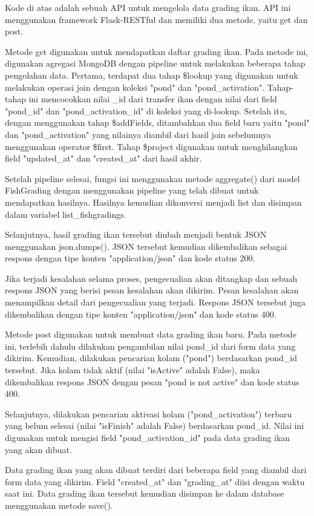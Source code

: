 \begin{enumerate}[1.]
Kode di atas adalah sebuah API untuk mengelola data grading ikan. API ini menggunakan framework Flask-RESTful dan memiliki dua metode, yaitu get dan post.

Metode get digunakan untuk mendapatkan daftar grading ikan. Pada metode ini, digunakan agregasi MongoDB dengan pipeline untuk melakukan beberapa tahap pengolahan data. Pertama, terdapat dua tahap \$lookup yang digunakan untuk melakukan operasi join dengan koleksi "pond" dan "pond\_activation". Tahap-tahap ini mencocokkan nilai \_id dari transfer ikan dengan nilai dari field "pond\_id" dan "pond\_activation\_id" di koleksi yang di-lookup. Setelah itu, dengan menggunakan tahap \$addFields, ditambahkan dua field baru yaitu "pond" dan "pond\_activation" yang nilainya diambil dari hasil join sebelumnya menggunakan operator \$first. Tahap \$project digunakan untuk menghilangkan field "updated\_at" dan "created\_at" dari hasil akhir.

Setelah pipeline selesai, fungsi ini menggunakan metode aggregate() dari model FishGrading dengan menggunakan pipeline yang telah dibuat untuk mendapatkan hasilnya. Hasilnya kemudian dikonversi menjadi list dan disimpan dalam variabel list\_fishgradings.

Selanjutnya, hasil grading ikan tersebut diubah menjadi bentuk JSON menggunakan json.dumps(). JSON tersebut kemudian dikembalikan sebagai respons dengan tipe konten "application/json" dan kode status 200.

Jika terjadi kesalahan selama proses, pengecualian akan ditangkap dan sebuah respons JSON yang berisi pesan kesalahan akan dikirim. Pesan kesalahan akan menampilkan detail dari pengecualian yang terjadi. Respons JSON tersebut juga dikembalikan dengan tipe konten "application/json" dan kode status 400.

Metode post digunakan untuk membuat data grading ikan baru. Pada metode ini, terlebih dahulu dilakukan pengambilan nilai pond\_id dari form data yang dikirim. Kemudian, dilakukan pencarian kolam ("pond") berdasarkan pond\_id tersebut. Jika kolam tidak aktif (nilai "isActive" adalah False), maka dikembalikan respons JSON dengan pesan "pond is not active" dan kode status 400.

Selanjutnya, dilakukan pencarian aktivasi kolam ("pond\_activation") terbaru yang belum selesai (nilai "isFinish" adalah False) berdasarkan pond\_id. Nilai ini digunakan untuk mengisi field "pond\_activation\_id" pada data grading ikan yang akan dibuat.

Data grading ikan yang akan dibuat terdiri dari beberapa field yang diambil dari form data yang dikirim. Field "created\_at" dan "grading\_at" diisi dengan waktu saat ini. Data grading ikan tersebut kemudian disimpan ke dalam database menggunakan metode save().


\end{enumerate}
